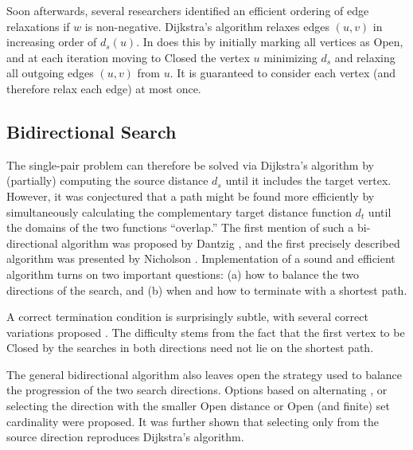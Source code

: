 \documentclass[nobib]{tufte-book}
\begin{document}
Soon afterwards,
several researchers
identified \citep{leyzorek1957modeltechniques, dijkstra1959anote}
an efficient ordering of edge relaxations
if $w$ is non-negative.
Dijkstra's algorithm relaxes edges $(u,v)$
in increasing order of $d_s(u)$.
In does this by initially marking all vertices as {\sc Open},
and at each iteration moving to {\sc Closed}
the vertex $u$ minimizing $d_s$
and relaxing all outgoing edges $(u,v)$ from $u$.
It is guaranteed to consider each vertex
(and therefore relax each edge) at most once.

\subsection{Bidirectional Search}

The single-pair problem can therefore be solved
via Dijkstra's algorithm
by (partially) computing the source distance $d_s$ until it
includes the target vertex.
However,
it was conjectured that a path might be found more efficiently
by simultaneously calculating the complementary
target distance function $d_t$
until the domains of the two functions ``overlap.''
The first mention of such a bi-directional algorithm
was proposed by Dantzig \citep{dantzig1963linearprogramming},
and the first precisely described algorithm was presented by
Nicholson \citep{nicholson1966shortest}.
Implementation of a sound and efficient algorithm
turns on two important questions:
(a) how to balance the two directions of the search,
and (b) when and how to terminate with a shortest path.

A correct termination condition is surprisingly subtle,%
with several correct variations proposed
\citep{nicholson1966shortest, dreyfus1969appraisalsp,
pohl1969bidirectional, goldberg2005spexternalmemory}.
The difficulty stems from the fact that the first vertex to be
{\sc Closed} by the searches in both directions
need not lie on the shortest path.

The general bidirectional algorithm also leaves open the strategy
used to balance the progression of the two search directions.
Options based on alternating \citep{dantzig1963linearprogramming},
or selecting the direction with the smaller {\sc Open} distance
\citep{nicholson1966shortest}
or {\sc Open} (and finite) set cardinality
\citep{pohl1969bidirectional}
were proposed.
It was further shown that selecting only from the source direction
reproduces Dijkstra's algorithm.
\end{document}
